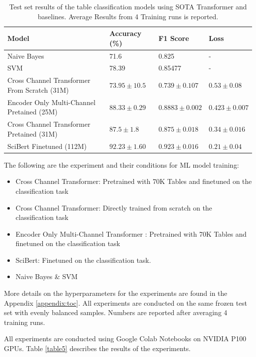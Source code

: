 \begin{table}[h]
    \label{table\arabic{tablecounter}}
    \centering
    \begin{tabular}{|p{4cm}|p{3cm}|p{3cm}|p{3cm}|}
    \hline
        \textbf{Model} & \textbf{Accuracy} (\%) & \textbf{F1 Score}  & \textbf{Loss} \\ \hline
        Naive Bayes & 71.6 & 0.825 & - \\ \hline
        SVM  & 78.39 & 0.85477 & - \\ \hline
        Cross Channel Transformer From Scratch (31M) & $73.95 \pm 10.5 $ & $0.739 \pm 0.107$ & $0.53 \pm 0.08$ \\ \hline
        Encoder Only Multi-Channel Pretained (25M) & $88.33 \pm 0.29$ & $0.8883 \pm 0.002$ & $0.423 \pm 0.007$ \\ \hline
        Cross Channel Transformer Pretained (31M) & $87.5 \pm 1.8$ & $0.875 \pm 0.018$ & $0.34 \pm 0.016$ \\ \hline
        SciBert Finetuned (112M) & $92.23 \pm 1.60$ & $0.923 \pm 0.016$ & $0.21 \pm 0.04$ \\ \hline
    \end{tabular}
    \caption{\label{tablecounter} Test set results of the table classification models using SOTA Transformer and baselines. Average Results from 4 Training runs is reported. }
\end{table}
The following are the experiment and their conditions for ML model training:
\begin{itemize}
    \item Cross Channel Transformer: Pretrained with 70K Tables and finetuned on the classification task
    \item Cross Channel Transformer: Directly trained from scratch on the classification task 
    \item Encoder Only Multi-Channel Transformer : Pretrained with 70K Tables and finetuned on the classification task
    \item SciBert: Finetuned on the classification task.
    \item Naive Bayes \& SVM
\end{itemize}
More details on the hyperparameters for the experiments are found in the Appendix \ref{appendix:toc}. All experiments are conducted on the same frozen test set with evenly balanced samples. Numbers are reported after averaging 4 training runs.

All experiments are conducted using Google Colab Notebooks on NVIDIA P100 GPUs. Table \ref{table5} describes the results of the experiments. 

